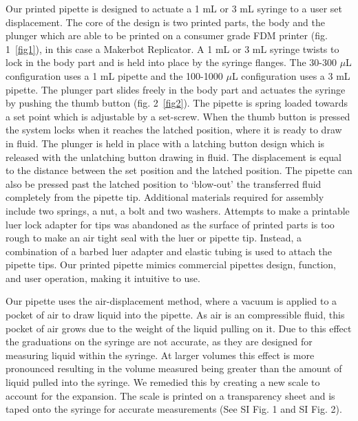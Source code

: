 \documentclass{naturegraphicx}
\begin{document}
\begin{methods}
Our printed pipette is designed to actuate a 1 mL or 3 mL syringe to a user set displacement.
The core of the design is two printed parts, the body and the plunger which are able to be printed on a consumer grade FDM printer (fig. 1~\ref{fig1}), in this case a Makerbot Replicator.
A 1 mL or 3 mL syringe twists to lock in the body part and is held into place by the syringe flanges.
The 30-300 $\mu$L configuration uses a 1 mL pipette and the 100-1000 $\mu$L configuration uses a 3 mL pipette.
The plunger part slides freely in the body part and actuates the syringe by pushing the thumb button (fig. 2~\ref{fig2}). 
The pipette is spring loaded towards a set point which is adjustable by a set-screw.
When the thumb button is pressed the system locks when it reaches the latched position, where it is ready to draw in fluid.
The plunger is held in place with a latching button design which is released with the unlatching button drawing in fluid.
The displacement is equal to the distance between the set position and the latched position.
The pipette can also be pressed past the latched position to `blow-out' the transferred fluid completely from the pipette tip.   
Additional materials required for assembly include two springs, a nut, a bolt and two washers.
Attempts to make a printable luer lock adapter for tips was abandoned as the surface of printed parts is too rough to make an air tight seal with the luer or pipette tip.
Instead, a combination of a barbed luer adapter and elastic tubing is used to attach the pipette tips.
Our printed pipette mimics commercial pipettes design, function, and user operation, making it intuitive to use.

Our pipette uses the air-displacement method, where a vacuum is applied to a pocket of air to draw liquid into the pipette.
As air is an compressible fluid, this pocket of air grows due to the weight of the liquid pulling on it.
Due to this effect the graduations on the syringe are not accurate, as they are designed for measuring liquid within the syringe.
At larger volumes this effect is more pronounced resulting in the volume measured being greater than the amount of liquid pulled into the syringe.
We remedied this by creating a new scale to account for the expansion.
The scale is printed on a transparency sheet and is taped onto the syringe for accurate measurements (See SI Fig. 1 and SI Fig. 2).%


\end{methods}
\end{document}
